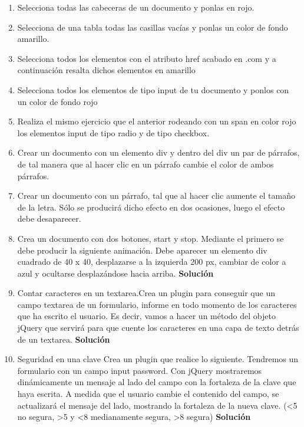 \documentclass[a4paper, oneside]{article}
\begin{document}
\begin{enumerate}
\item Selecciona todas las cabeceras de un documento y ponlas en rojo.

\item Selecciona de una tabla todas las casillas vacías y ponlas un color de fondo amarillo.

\item Selecciona todos los elementos con el atributo href acabado en .com y a continuación resalta dichos elementos en amarillo

\item Selecciona todos los elementos de tipo input de tu documento y ponlos con un color de fondo rojo

\item Realiza el mismo ejercicio que el anterior rodeando con un span en color rojo los elementos input de tipo radio y de tipo checkbox.

\item Crear un documento con un elemento div y dentro del div  un par de párrafos, de tal manera que al hacer clic en un párrafo cambie el color de ambos párrafos.

\item Crear un documento con un párrafo, tal que al hacer clic aumente el tamaño de la letra. Sólo se producirá dicho efecto en dos ocasiones, luego el efecto debe desaparecer.

\item Crea un documento con dos botones, start y stop. Mediante el primero se debe producir la siguiente animación. Debe aparecer un elemento div cuadrado de 40 x 40, desplazarse a la izquierda 200 px, cambiar de color a azul y ocultarse desplazándose hacia arriba. \textbf{Solución}

\item Contar caracteres en un textarea.Crea un plugin para conseguir que un campo textarea de un formulario, informe en todo momento de los caracteres que ha escrito el usuario. Es decir, vamos a hacer un método del objeto jQuery que servirá para que cuente los caracteres en una capa de texto detrás de un textarea. \textbf{Solución}

\item Seguridad en una clave Crea un plugin que realice lo siguiente. Tendremos un formulario con un campo input password. Con jQuery mostraremos dinámicamente un mensaje al lado del campo con la fortaleza de la clave que haya escrita. A medida que el usuario cambie el contenido del campo, se actualizará el mensaje del lado, mostrando la fortaleza de la nueva clave. (<5 no segura, >5 y <8 medianamente segura, >8 segura) \textbf{Solución}


\end{enumerate}
\end{document}
